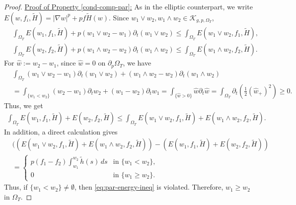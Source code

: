 \documentclass[11pt,oneside,english]{amsart}
\newcommand{\cK}{{\mathcal K}}
\newcommand{\D}{\nabla}
\numberwithin{equation}{section}
\theoremstyle{plain}
\numberwithin{equation}{section}
\begin{document}
\begin{proof}
\noindent 
\underline{Proof of Property \ref{cond-comp-par}:}
 As in the elliptic counterpart, we write $E(w,f_i,\tilde H)=|\D w|^p+pf\tilde H(w)$. Since $w_1\vee w_2, w_1\wedge w_2\in \cK_{g,p,\Omega_T}$,
\begin{align*}
    &\int_{\Omega_T}E(w_1,f_1,\tilde H)+p(w_1\vee w_2-w_1)\partial_t(w_1\vee w_2)\le \int_{\Omega_T}E(w_1\vee w_2,f_1,\tilde H),\\
    &\int_{\Omega_T}E(w_2,f_2,\tilde H)+p(w_1\wedge w_2-w_2)\partial_t(w_1\wedge w_2)\le \int_{\Omega_T}E(w_1\wedge w_2,f_2,\tilde H).
\end{align*}
For $\hat w:=w_2-w_1$, since $\hat w=0$ on $\partial_p\Omega_T$, we have
\begin{align*}
    &\int_{\Omega_T}(w_1\vee w_2-w_1)\partial_t(w_1\vee w_2)+(w_1\wedge w_2-w_2)\partial_t(w_1\wedge w_2)\\
    &=\int_{\{w_1<w_2\}}(w_2-w_1)\partial_tw_2+(w_1-w_2)\partial_tw_1=\int_{\{\hat w>0\}}\hat w\partial_t\hat w=\int_{\Omega_T}\partial_t\left(\frac12(\hat w_+)^2\right)\ge0.
\end{align*}
Thus, we get
\begin{align}\label{eq:par-energy-ineq}
    \int_{\Omega_T}E(w_1,f_1,\tilde H)+E(w_2,f_2,\tilde H)\le \int_{\Omega_T}E(w_1\vee w_2,f_1,\tilde H)+E(w_1\wedge w_2,f_2,\tilde H).
\end{align}
In addition, a direct calculation gives
\begin{align*}
    &((E(w_1\vee w_2,f_1,\tilde H)+E(w_1\wedge w_2,f_2,\tilde H))-(E(w_1,f_1,\tilde H)+E(w_2,f_2,\tilde H))\\
    &=\begin{cases}
        p(f_1-f_2)\int_{w_1}^{w_2}\tilde h(s)\,ds  &\text{in }\{w_1<w_2\},\\
        0&\text{in }\{w_1\ge w_2\}.
    \end{cases}
\end{align*}
Thus, if $\{w_1<w_2\}\neq\emptyset$, then \eqref{eq:par-energy-ineq} is violated. Therefore, $w_1\ge w_2$ in $\Omega_T$.

\medskip


\end{proof}
\end{document}
